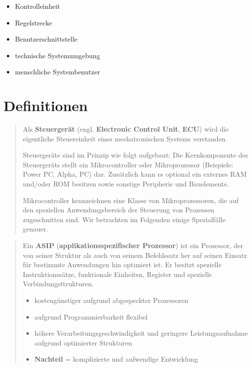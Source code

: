 \documentclass[
]{article}
\providecommand{\tightlist}{%
  \setlength{\itemsep}{0pt}\setlength{\parskip}{0pt}}
\begin{document}
\begin{itemize}
\tightlist
\item
  Kontrolleinheit
\item
  Regelstrecke
\item
  Benutzerschnittstelle
\item
  technische Systemumgebung
\item
  menschliche Systembenutzer
\end{itemize}

\hypertarget{definitionen}{%
\section{Definitionen}\label{definitionen}}

\begin{quote}
Als \textbf{Steuergerät} (engl. \textbf{Electronic Control Unit},
\textbf{ECU}) wird die eigentliche Steuereinheit eines mechatronischen
Systems verstanden.

Steuergeräte sind im Prinzip wie folgt aufgebaut: Die Kernkomponente des
Steuergeräts stellt ein Mikrocontroller oder Mikroprozessor (Beispiele:
Power PC, Alpha, PC) dar. Zusätzlich kann es optional ein externes RAM
und/oder ROM besitzen sowie sonstige Peripherie und Bauelemente.

Mikrocontroller kennzeichnen eine Klasse von Mikroprozessoren, die auf
den speziellen Anwendungsbereich der Steuerung von Prozessen
zugeschnitten sind. Wir betrachten im Folgenden einige Spezialfälle
genauer.
\end{quote}

\begin{quote}
Ein \textbf{ASIP} (\textbf{applikationsspezifischer Prozessor}) ist ein
Prozessor, der von seiner Struktur als auch von seinem Befehlssatz her
auf seinen Einsatz für bestimmte Anwendungen hin optimiert ist. Er
besitzt spezielle Instruktionssätze, funktionale Einheiten, Register und
spezielle Verbindungsttrukturen.

\begin{itemize}
\tightlist
\item
  kostengünstiger aufgrund abgespeckter Prozessoren
\item
  aufgrund Programmierbarkeit flexibel
\item
  höhere Verarbeitungsgeschwindigkeit und geringere Leistungsaufnahme
  aufgrund optimierter Strukturen
\item
  \textbf{Nachteil} = komplizierte und aufwendige Entwicklung
\end{itemize}
\end{quote}
\end{document}
